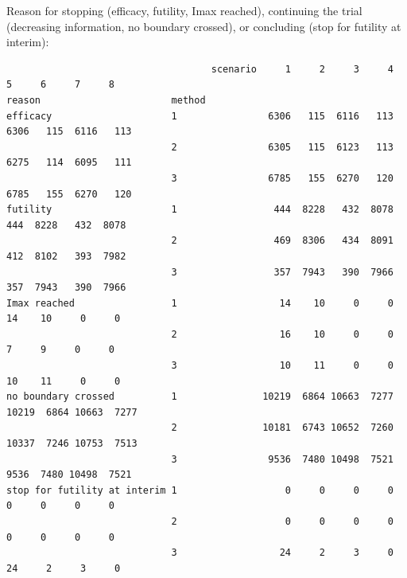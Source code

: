 \documentclass[12pt]{article}
\begin{document}
Reason for stopping (efficacy, futility, Imax reached), continuing the
trial (decreasing information, no boundary crossed), or concluding
(stop for futility at interim):
\begin{verbatim}
                                    scenario     1     2     3     4     5     6     7     8
reason                       method                                                         
efficacy                     1                6306   115  6116   113  6306   115  6116   113
                             2                6305   115  6123   113  6275   114  6095   111
                             3                6785   155  6270   120  6785   155  6270   120
futility                     1                 444  8228   432  8078   444  8228   432  8078
                             2                 469  8306   434  8091   412  8102   393  7982
                             3                 357  7943   390  7966   357  7943   390  7966
Imax reached                 1                  14    10     0     0    14    10     0     0
                             2                  16    10     0     0     7     9     0     0
                             3                  10    11     0     0    10    11     0     0
no boundary crossed          1               10219  6864 10663  7277 10219  6864 10663  7277
                             2               10181  6743 10652  7260 10337  7246 10753  7513
                             3                9536  7480 10498  7521  9536  7480 10498  7521
stop for futility at interim 1                   0     0     0     0     0     0     0     0
                             2                   0     0     0     0     0     0     0     0
                             3                  24     2     3     0    24     2     3     0
\end{verbatim}
\end{document}
